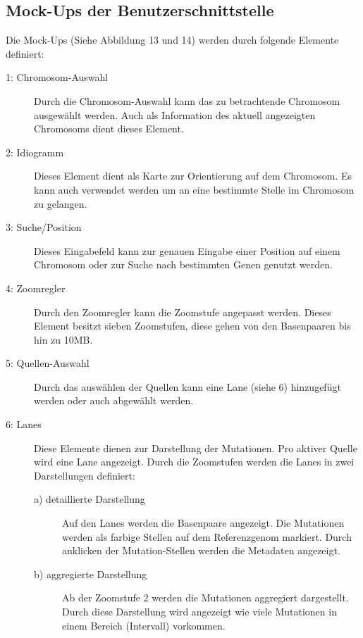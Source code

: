 \subsection{Mock-Ups der Benutzerschnittstelle}
Die Mock-Ups (Siehe Abbildung 13 und 14) werden durch folgende Elemente definiert:
\begin{description}
	\item[1: Chromosom-Auswahl] Durch die Chromosom-Auswahl kann das zu betrachtende Chromosom ausgewählt werden. Auch als Information des aktuell angezeigten Chromosoms dient dieses Element.
	\item[2: Idiogramm] Dieses Element dient als Karte zur Orientierung auf dem Chromosom. Es kann auch verwendet werden um an eine bestimmte Stelle im Chromosom zu gelangen.
	\item[3: Suche/Position] Dieses Eingabefeld kann zur genauen Eingabe einer Position auf einem Chromosom oder zur Suche nach bestimmten Genen genutzt werden.
	\item[4: Zoomregler] Durch den Zoomregler kann die Zoomstufe angepasst werden. Dieses Element besitzt sieben Zoomstufen, diese gehen von den Basenpaaren bis hin zu 10MB. 
	\item[5: Quellen-Auswahl] Durch das auswählen der Quellen kann eine Lane (siehe 6) hinzugefügt werden oder auch abgewählt werden.
	\item[6: Lanes] Diese Elemente dienen zur Darstellung der Mutationen. Pro aktiver Quelle wird eine Lane angezeigt. Durch die Zoomstufen werden die Lanes in zwei Darstellungen definiert:
	\begin{description}
		\item[a) detaillierte Darstellung] Auf den Lanes werden die Basenpaare angezeigt. Die Mutationen werden als farbige Stellen auf dem Referenzgenom markiert. Durch anklicken der Mutation-Stellen werden die Metadaten angezeigt.
		\item[b) aggregierte Darstellung] Ab der Zoomstufe 2 werden die Mutationen aggregiert dargestellt. Durch diese Darstellung wird angezeigt wie viele Mutationen in einem Bereich (Intervall) vorkommen.
	\end{description}
\end{description}
\begin{landscape}
  \begin{figure}
  \end{figure}
\end{landscape}

